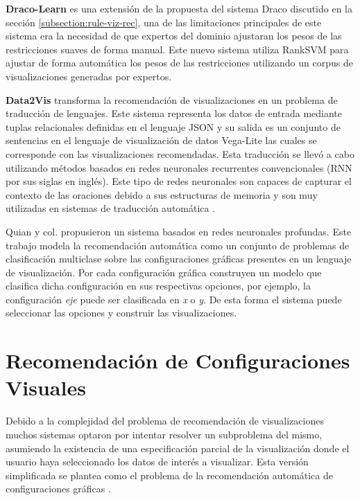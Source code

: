 \textbf{Draco-Learn} \cite{moritz2018draco} es una extensi\'on de la propuesta del sistema Draco discutido en la
secci\'on \ref{subsection:rule-viz-rec}, una de las limitaciones principales de este sistema era la necesidad
de que expertos del dominio ajustaran los pesos de las restricciones suaves de forma manual. Este nuevo sistema
utiliza RankSVM para ajustar de forma autom\'atica los pesos de las restricciones utilizando un corpus de visualizaciones
generadas por expertos.


\textbf{Data2Vis} \cite{dibia2019data2vis} transforma la recomendaci\'on de visualizaciones en un problema de
traducci\'on de lenguajes. Este sistema representa los datos de entrada mediante tuplas
relacionales definidas en el lenguaje JSON y su salida es un conjunto de sentencias
en el lenguaje de visualizaci\'on de datos Vega-Lite las cuales se corresponde con las
visualizaciones recomendadas. Esta traducci\'on se llev\'o a cabo utilizando m\'etodos
basados en redes neuronales recurrentes convencionales (RNN por sus siglas en ingl\'es).
Este tipo de redes neuronales son capaces de capturar el contexto de las oraciones debido
a sus estructuras de memoria y son muy utilizadas en sistemas de traducci\'on autom\'atica \cite{sutskever2014sequence}.


Quian y col. \cite{qian2020ml} propusieron un sistema basados en redes neuronales profundas. Este trabajo modela
la recomendaci\'on autom\'atica como un conjunto de problemas de clasificaci\'on multiclase sobre las configuraciones gr\'aficas
presentes en un lenguaje de visualizaci\'on. Por cada
configuraci\'on gr\'afica construyen un modelo que clasifica dicha configuraci\'on en sus respectivas opciones, por ejemplo,
la configuraci\'on \textit{eje} puede ser clasificada en \textit{x} o \textit{y}. De esta forma el sistema puede
seleccionar las opciones y construir las visualizaciones.


\section{Recomendaci\'on de Configuraciones Visuales}

Debido a la complejidad del problema de recomendaci\'on de visualizaciones muchos
sistemas optaron por intentar resolver un subproblema del mismo,
asumiendo la existencia de una especificaci\'on parcial de la visualizaci\'on donde el usuario haya seleccionado
los datos de inter\'es a visualizar. Esta versi\'on simplificada se plantea como el problema de la
recomendaci\'on autom\'atica de configuraciones gr\'aficas \cite{qin2020making}.


